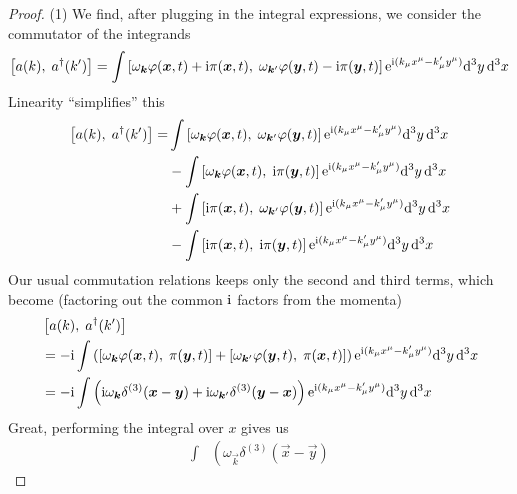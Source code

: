 \begin{proof}
(1) We find, after plugging in the integral expressions, we consider the
  commutator of the integrands
\begin{equation*}
\commutator{a(k)}{a^{\dagger}(k')}
=\int\commutator{\omega_{\vec{k}}\varphi(\vec{x},t)+\I\pi(\vec{x},t)}{\omega_{\vec{k}'}\varphi(\vec{y},t)-\I\pi(\vec{y},t)}\E^{\I (k_{\mu}x^{\mu}-k'_{\mu}y^{\mu})}\D^{3}y\,\D^{3}x
\end{equation*}
Linearity ``simplifies'' this
\begin{equation}\label{eq:proof:ladder-operator-commutation:expansion}
\begin{split}
\commutator{a(k)}{a^{\dagger}(k')}
=&\int\commutator{\omega_{\vec{k}}\varphi(\vec{x},t)}{\omega_{\vec{k}'}\varphi(\vec{y},t)}\E^{\I (k_{\mu}x^{\mu}-k'_{\mu}y^{\mu})}\D^{3}y\,\D^{3}x\\
&-\int\commutator{\omega_{\vec{k}}\varphi(\vec{x},t)}{\I\pi(\vec{y},t)}\E^{\I (k_{\mu}x^{\mu}-k'_{\mu}y^{\mu})}\D^{3}y\,\D^{3}x\\
&+\int\commutator{\I\pi(\vec{x},t)}{\omega_{\vec{k}'}\varphi(\vec{y},t)}\E^{\I (k_{\mu}x^{\mu}-k'_{\mu}y^{\mu})}\D^{3}y\,\D^{3}x\\
&-\int\commutator{\I\pi(\vec{x},t)}{\I\pi(\vec{y},t)}\E^{\I (k_{\mu}x^{\mu}-k'_{\mu}y^{\mu})}\D^{3}y\,\D^{3}x
\end{split}
\end{equation}
Our usual commutation relations keeps only the second and third terms,
which become (factoring out the common $\mathrm{i}$ factors from the momenta)
\begin{align}
&\commutator{a(k)}{a^{\dagger}(k')}\nonumber\\
&=-\I\int\left(\commutator{\omega_{\vec{k}}\varphi(\vec{x},t)}{\pi(\vec{y},t)}
+\commutator{\omega_{\vec{k}'}\varphi(\vec{y},t)}{\pi(\vec{x},t)}\right)\E^{\I (k_{\mu}x^{\mu}-k'_{\mu}y^{\mu})}\D^{3}y\,\D^{3}x\nonumber\\
&=-\I\int\left(\I\omega_{\vec{k}}\delta^{(3)}(\vec{x}-\vec{y})
+\I\omega_{\vec{k}'}\delta^{(3)}(\vec{y}-\vec{x})\right)\E^{\I (k_{\mu}x^{\mu}-k'_{\mu}y^{\mu})}\D^{3}y\,\D^{3}x
\end{align}
Great, performing the integral over $x$ gives us
\begin{equation}
\begin{split}
\int&\left(\omega_{\vec{k}}\delta^{(3)}(\vec{x}-\vec{y})

\end{split}
\end{equation}
\end{proof}

